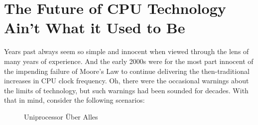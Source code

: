 
\section{The Future of CPU Technology Ain't What it Used to Be}
\label{sec:future:The Future of CPU Technology Ain't What it Used to Be}

Years past always seem so simple and innocent when viewed through the
lens of many years of experience.
And the early 2000s were for the most part innocent of the impending
failure of Moore's Law to continue delivering the then-traditional
increases in CPU clock frequency.
Oh, there were the occasional warnings about the limits of technology,
but such warnings had been sounded for decades.
With that in mind, consider the following scenarios:

\begin{figure}[tb]
\centering
{}
\caption{Uniprocessor \"Uber Alles}
\end{figure}

